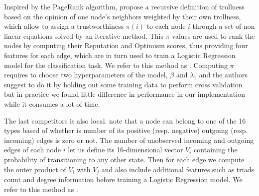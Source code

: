 Inspired by the PageRank algorithm, \textcite{wu2016troll} propose a recursive definition of
trollness based on the opinion of one node's neighbors weighted by their own trollness, which allow
to assign a trustworthiness $\pi(i)$ to each node $i$ through a set of non linear equations solved
by an iterative method. This $\pi$ values are used to rank the nodes by computing their Reputation
and Optimism scores, thus providing four features for each edge, which are in turn used to train a
Logistic Regression model for the classification task. We refer to this method as
\emph{\compranknodes{}}.  Computing $\pi$ requires to choose two hyperparameters of the model,
$\beta$ and $\lambda_1$ and the authors suggest to do it by holding out some training data to
perform cross validation but in practice we found little difference in performance in our
implementation while it consumes a lot of time.

The last competitors is also local. \textcite{Bayesian15} note that  a node can belong to one of the
16 types based of whether is number of its positive (resp.  negative) outgoing (resp. incoming)
edges is zero or not.  The number of unobserved incoming and outgoing edges of each node $i$ let us
define its 16-dimensional vector $V_i$ containing the probability of transitioning to any other
state.  Then for each edge \eij we compute the outer product of $V_i$ with $V_j$ and also include
additional features such as triads count and degree information before training a Logistic
Regression model. We refer to this method as \emph{\compbayesian{}}.
\fi

